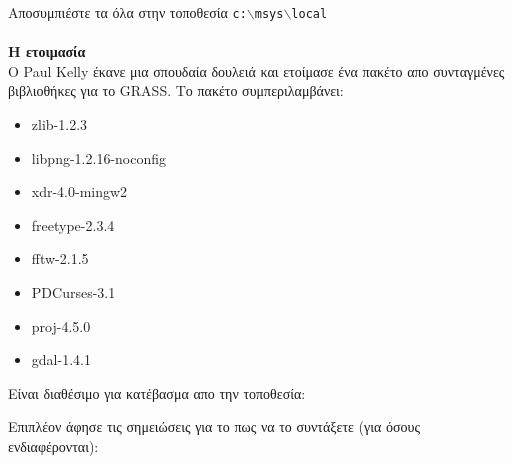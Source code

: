 	\begin{quotation}
	\end{quotation}

	\begin{quotation}
	\end{quotation}

Αποσυμπιέστε τα όλα στην τοποθεσία \texttt{c:$\backslash$msys$\backslash$local}

\paragraph{}\textbf{Η ετοιμασία}\\

O Paul Kelly έκανε μια σπουδαία δουλειά και ετοίμασε ένα πακέτο απο συνταγμένες βιβλιοθήκες για το GRASS. Το πακέτο συμπεριλαμβάνει:

\begin{itemize}
\item zlib-1.2.3
\item libpng-1.2.16-noconfig
\item xdr-4.0-mingw2
\item freetype-2.3.4
\item fftw-2.1.5
\item PDCurses-3.1
\item proj-4.5.0
\item gdal-1.4.1
\end{itemize}

Είναι διαθέσιμο για κατέβασμα απο την τοποθεσία:

	\begin{quotation}
	\end{quotation}

Επιπλέον άφησε τις σημειώσεις για το πως να το συντάξετε (για όσους ενδιαφέρονται):

	\begin{quotation}
	\end{quotation}

